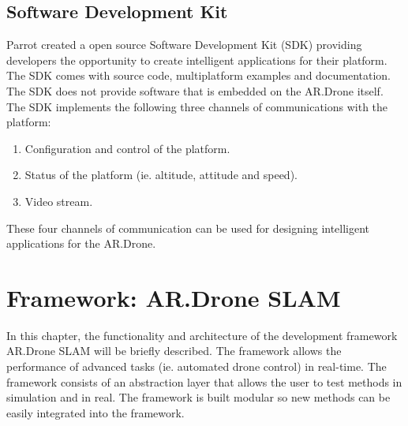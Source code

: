 \documentclass[a4paper]{article}
\begin{document}
\begin{appendices}
\subsection{Software Development Kit}
Parrot created a open source Software Development Kit (SDK) providing developers the opportunity to create intelligent applications for their platform. The SDK comes with source code, multiplatform examples and documentation. The SDK does not provide software that is embedded on the AR.Drone itself. The SDK implements the following three channels of communications with the platform:
\begin{enumerate}
\item Configuration and control of the platform.
\item Status of the platform (ie. altitude, attitude and speed).
\item Video stream.
\end{enumerate}
These four channels of communication can be used for designing intelligent applications for the AR.Drone.

\newpage
\section{Framework: AR.Drone SLAM}
\label{FRAMEWORK}
In this chapter, the functionality and architecture of the development framework AR.Drone SLAM \cite{Dijkshoorn2012} will be briefly described. The framework allows the performance of advanced tasks (ie. automated drone control) in real-time. The framework consists of an abstraction layer that allows the user to test methods in simulation and in real. The framework is built modular so new methods can be  easily integrated into the framework.

\end{appendices}
\end{document}
